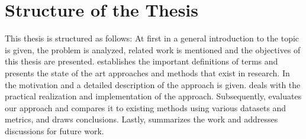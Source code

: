 \section{Structure of the Thesis}
\label{sec:structure_of_thesis}

This thesis is structured as follows:
At first in \textbf{} a general introduction to the topic is given, the problem is analyzed, related work is mentioned and the objectives of this thesis are presented.
\textbf{} establishes the important definitions of terms and presents the state of the art approaches and methods that exist in research.
In \textbf{} the motivation and a detailed description of the approach is given.
\textbf{} deals with the practical realization and implementation of the approach.
Subsequently, \textbf{} evaluates our approach and compares it to existing methods using various datasets and metrics, and draws conclusions.
Lastly, \textbf{} summarizes the work and addresses discussions for future work.